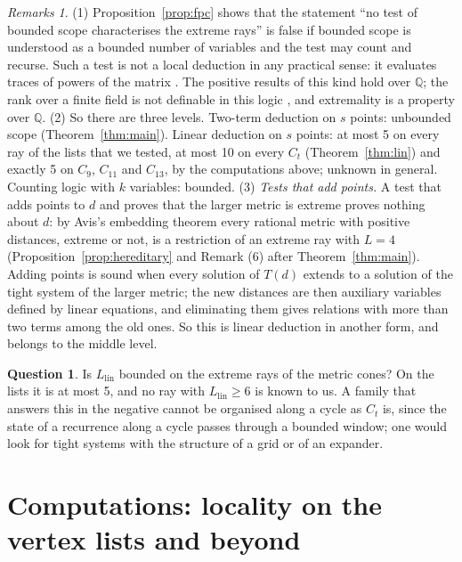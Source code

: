 \documentclass[11pt,a4paper]{article}
\theoremstyle{definition}
\newtheorem{question}{Question}
\theoremstyle{remark}
\newtheorem*{remarks}{Remarks}
\newcommand{\Q}{\mathbb{Q}}
\begin{document}
\begin{remarks}
(1) Proposition~\ref{prop:fpc} shows that the statement ``no test of bounded scope characterises the extreme
rays'' is false if bounded scope is understood as a bounded number of variables and the test may count and recurse.
Such a test is not a local deduction in any practical sense: it evaluates traces of powers of the matrix
\cite{DGHL09}. The positive results of this kind hold over $\Q$; the rank over a finite field is not definable in
this logic \cite{DGHL09}, and extremality is a property over $\Q$.
(2) So there are three levels. Two-term deduction on $s$ points: unbounded scope (Theorem~\ref{thm:main}).
Linear deduction on $s$ points: at most 5 on every ray of the lists that we tested, at most 10 on every $C_t$
(Theorem~\ref{thm:lin}) and exactly 5 on $C_9$, $C_{11}$ and $C_{13}$, by
the computations above; unknown in general. Counting logic
with $k$ variables: bounded.
(3) \emph{Tests that add points.} A test that adds points to $d$ and proves that the larger metric is extreme
proves nothing about $d$: by Avis's embedding theorem every rational metric with positive distances, extreme or
not, is a restriction of an extreme ray with $L = 4$ (Proposition~\ref{prop:hereditary} and Remark (6) after
Theorem~\ref{thm:main}). Adding points is sound when every solution of $T(d)$ extends to a solution of the tight
system of the larger metric; the new distances are then auxiliary variables defined by linear equations, and
eliminating them gives relations with more than two terms among the old ones. So this is linear deduction in
another form, and belongs to the middle level.
\end{remarks}

\begin{question}\label{q:lin}
Is $L_{\mathrm{lin}}$ bounded on the extreme rays of the metric cones? On the lists it is at most 5, and no
ray with $L_{\mathrm{lin}} \ge 6$ is known to us. A family that answers
this in the negative cannot be organised along a cycle as $C_t$ is, since the state of a recurrence along a cycle passes through a
bounded window; one would look for tight systems with the structure of a grid or of an expander.
\end{question}

\section{Computations: locality on the vertex lists and beyond}
\end{document}
